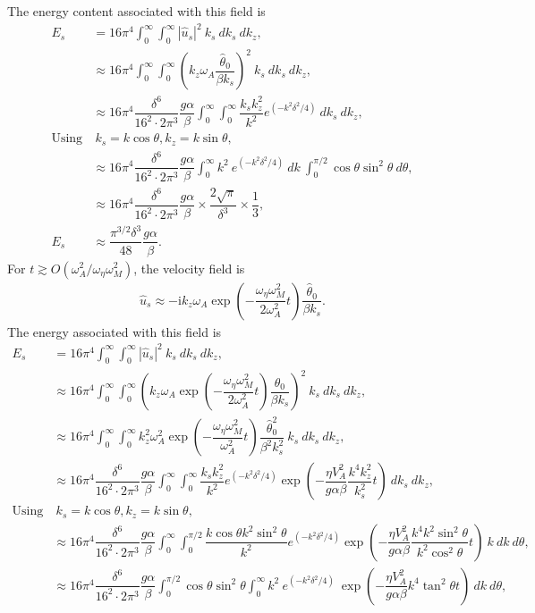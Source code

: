 \documentclass[12pt,psfig]{article}
\begin{document}
The energy content associated with this field is
\begin{align*}
E_{s}&= 16\pi^4\int_{0}^{\infty}\int_{0}^{\infty}|\hat{u}_s|^2 \ k_s \ dk_s \ dk_z, \\
&\approx 16\pi^4\int_{0}^{\infty}\int_{0}^{\infty}\left(k_z\omega_A\dfrac{\hat{\theta}_0}{\beta k_s}\right)^2 \ k_s \ dk_s \ dk_z, \\
&\approx 16\pi^4\dfrac{\delta^6}{16^2\cdot 2\pi^3}\dfrac{g\alpha}{\beta }\int_{0}^{\infty}\int_{0}^{\infty}\dfrac{k_sk_z^2}{k^2}e^{(-k^2\delta^2/4)} \ dk_s \ dk_z, \\
\text{Using}& \ k_s=k\cos\theta, k_z=k\sin\theta,\\
&\approx 16\pi^4\dfrac{\delta^6}{16^2\cdot 2\pi^3}\dfrac{g\alpha}{\beta }\int_{0}^{\infty}k^2\ e^{(-k^2\delta^2/4)}  \ dk \ \int_{0}^{\pi/2}\cos\theta \sin^2\theta \ d\theta, \\
&\approx 16\pi^4\dfrac{\delta^6}{16^2\cdot 2\pi^3}\dfrac{g\alpha}{\beta }\times \dfrac{2\sqrt{\pi}}{\delta^3}\times \dfrac{1}{3}, \\
E_s&\approx \dfrac{\pi^{3/2}\delta^3}{48}\dfrac{g\alpha}{\beta }.
\end{align*}
For $t\gtrsim O(\omega_A^2/\omega_\eta\omega_M^2)$, the velocity field is
\begin{align*}
\hat{u}_s\approx -\mathrm{i}k_z\omega_A\exp\left(-\dfrac{\omega_\eta\omega_M^2}{2\omega_A^2}t\right)\dfrac{\hat{\theta}_0}{\beta k_s}.
\end{align*}
The energy associated with this field is
\begin{align*}
E_{s}&= 16\pi^4\int_{0}^{\infty}\int_{0}^{\infty}|\hat{u}_s|^2 \ k_s \ dk_s \ dk_z, \\
&\approx 16\pi^4\int_{0}^{\infty}\int_{0}^{\infty}\left(k_z\omega_A\exp\left(-\dfrac{\omega_\eta\omega_M^2}{2\omega_A^2}t\right)\dfrac{\hat{\theta}_0}{\beta k_s}\right)^2 \ k_s \ dk_s \ dk_z, \\
&\approx 16\pi^4\int_{0}^{\infty}\int_{0}^{\infty}k_z^2\omega_A^2\exp\left(-\dfrac{\omega_\eta\omega_M^2}{\omega_A^2}t\right)\dfrac{\hat{\theta}^2_0}{\beta^2 k_s^2} \ k_s \ dk_s \ dk_z, \\
&\approx 16\pi^4\dfrac{\delta^6}{16^2\cdot 2\pi^3}\dfrac{g\alpha}{\beta }\int_{0}^{\infty}\int_{0}^{\infty}\dfrac{k_sk_z^2}{k^2}e^{(-k^2\delta^2/4)}\exp\left(-\dfrac{\eta V_A^2}{g\alpha\beta}\dfrac{k^4k_z^2}{k_s^2}t\right) \ dk_s \ dk_z, \\
\text{Using}& \ k_s=k\cos\theta, k_z=k\sin\theta,\\
&\approx 16\pi^4\dfrac{\delta^6}{16^2\cdot 2\pi^3}\dfrac{g\alpha}{\beta }\int_{0}^{\infty}\int_{0}^{\pi/2}\dfrac{k\cos\theta k^2\sin^2\theta}{k^2}e^{(-k^2\delta^2/4)}\exp\left(-\dfrac{\eta V_A^2}{g\alpha\beta}\dfrac{k^4k^2\sin^2\theta}{k^2\cos^2\theta}t\right) \ k \ dk \ d\theta, \\
&\approx 16\pi^4\dfrac{\delta^6}{16^2\cdot 2\pi^3}\dfrac{g\alpha}{\beta } \int_{0}^{\pi/2}\cos\theta \sin^2\theta \int_{0}^{\infty}k^2 \ e^{(-k^2\delta^2/4)} \ \exp\left(-\dfrac{\eta V_A^2}{g\alpha\beta}k^4\tan^2\theta t\right) \ dk \ d\theta, \\
\end{align*}
\end{document}
